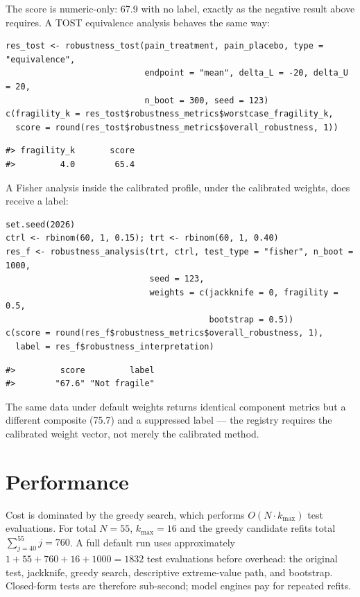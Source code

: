 The score is numeric-only: 67.9
with no label, exactly as the negative result above requires. A TOST
equivalence analysis behaves the same way:

\begin{verbatim}
res_tost <- robustness_tost(pain_treatment, pain_placebo, type = "equivalence",
                            endpoint = "mean", delta_L = -20, delta_U = 20,
                            n_boot = 300, seed = 123)
c(fragility_k = res_tost$robustness_metrics$worstcase_fragility_k,
  score = round(res_tost$robustness_metrics$overall_robustness, 1))
\end{verbatim}

\begin{verbatim}
#> fragility_k       score 
#>         4.0        65.4
\end{verbatim}

A Fisher analysis inside the calibrated profile, under the calibrated weights,
does receive a label:

\begin{verbatim}
set.seed(2026)
ctrl <- rbinom(60, 1, 0.15); trt <- rbinom(60, 1, 0.40)
res_f <- robustness_analysis(trt, ctrl, test_type = "fisher", n_boot = 1000,
                             seed = 123,
                             weights = c(jackknife = 0, fragility = 0.5,
                                         bootstrap = 0.5))
c(score = round(res_f$robustness_metrics$overall_robustness, 1),
  label = res_f$robustness_interpretation)
\end{verbatim}

\begin{verbatim}
#>         score         label 
#>        "67.6" "Not fragile"
\end{verbatim}

The same data under default weights returns identical component metrics but a
different composite (75.7)
and a suppressed label --- the registry requires the calibrated weight vector,
not merely the calibrated method.

\FloatBarrier

\section{Performance}\label{performance}

Cost is dominated by the greedy search, which performs \(O(N \cdot k_{\max})\)
test evaluations. For total \(N=55\), \(k_{\max}=16\) and the greedy candidate
refits total \(\sum_{j=40}^{55}j=760\). A full default run uses approximately
\(1+55+760+16+1000=1832\) test evaluations before overhead: the original test,
jackknife, greedy search, descriptive extreme-value path, and bootstrap.
Closed-form tests are therefore sub-second; model engines pay for repeated
refits.

